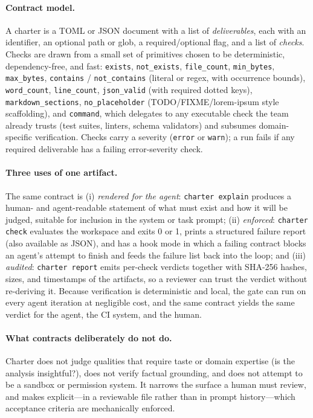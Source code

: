 \documentclass{article}
\begin{document}
\paragraph{Contract model.} A charter is a TOML or JSON document with a list of
\emph{deliverables}, each with an identifier, an optional path or glob, a
required/optional flag, and a list of \emph{checks}. Checks are drawn from a
small set of primitives chosen to be deterministic, dependency-free, and fast:
\texttt{exists}, \texttt{not\_exists}, \texttt{file\_count}, \texttt{min\_bytes},
\texttt{max\_bytes}, \texttt{contains} / \texttt{not\_contains} (literal or regex,
with occurrence bounds), \texttt{word\_count}, \texttt{line\_count},
\texttt{json\_valid} (with required dotted keys), \texttt{markdown\_sections},
\texttt{no\_placeholder} (TODO/FIXME/lorem-ipsum style scaffolding), and
\texttt{command}, which delegates to any executable check the team already
trusts (test suites, linters, schema validators) and subsumes domain-specific
verification. Checks carry a severity (\texttt{error} or \texttt{warn}); a run
fails if any required deliverable has a failing error-severity check.

\paragraph{Three uses of one artifact.} The same contract is (i) \emph{rendered
for the agent}: \texttt{charter explain} produces a human- and agent-readable
statement of what must exist and how it will be judged, suitable for inclusion in
the system or task prompt; (ii) \emph{enforced}: \texttt{charter check} evaluates
the workspace and exits 0 or 1, prints a structured failure report (also
available as JSON), and has a hook mode in which a failing contract blocks an
agent's attempt to finish and feeds the failure list back into the loop; and
(iii) \emph{audited}: \texttt{charter report} emits per-check verdicts together
with SHA-256 hashes, sizes, and timestamps of the artifacts, so a reviewer can
trust the verdict without re-deriving it. Because verification is deterministic
and local, the gate can run on every agent iteration at negligible cost, and the
same contract yields the same verdict for the agent, the CI system, and the
human.

\paragraph{What contracts deliberately do not do.} Charter does not judge
qualities that require taste or domain expertise (is the analysis insightful?),
does not verify factual grounding, and does not attempt to be a sandbox or
permission system. It narrows the surface a human must review, and makes
explicit---in a reviewable file rather than in prompt history---which acceptance
criteria are mechanically enforced.
\end{document}
